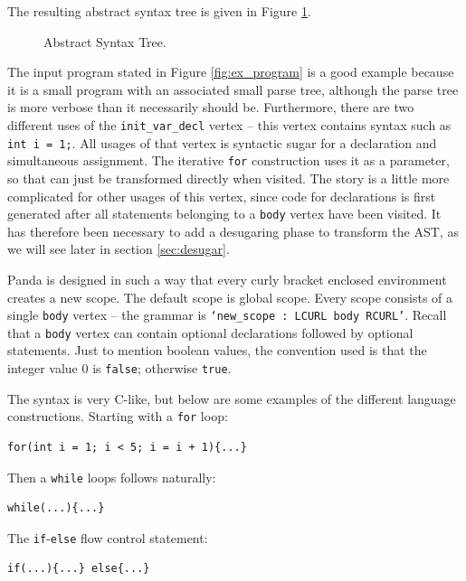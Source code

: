 The resulting abstract syntax tree is given in Figure \ref{fig:AST}.

\begin{figure}[H]
    \centering
    
    \caption{Abstract Syntax Tree.} 
    \label{fig:AST}
\end{figure}

The input program stated in Figure \ref{fig:ex_program} is a good example because it is a small program with an associated small parse tree, although the parse tree is more verbose than it necessarily should be. Furthermore, there are two different uses of the \texttt{init\_var\_decl} vertex -- this vertex contains syntax such as \texttt{int i = 1;}. All usages of that vertex is syntactic sugar for a declaration and simultaneous assignment. The iterative \texttt{for} construction uses it as a parameter, so that can just be transformed directly when visited. The story is a little more complicated for other usages of this vertex, since code for declarations is first generated after all statements belonging to a \texttt{body} vertex have been visited. It has therefore been necessary to add a desugaring phase to transform the AST, as we will see later in section \ref{sec:desugar}.

Panda is designed in such a way that every curly bracket enclosed environment creates a new scope. The default scope is global scope. Every scope consists of a single \texttt{body} vertex -- the grammar is \texttt{`new\_scope : LCURL body RCURL'}. Recall that a \texttt{body} vertex can contain optional declarations followed by optional statements. Just to mention boolean values, the convention used is that the integer value $0$ is \texttt{false}; otherwise \texttt{true}.

The syntax is very C-like, but below are some examples of the different language constructions. Starting with a \texttt{for} loop:

\begin{verbatim}
for(int i = 1; i < 5; i = i + 1){...}
\end{verbatim}

Then a \texttt{while} loops follows naturally:

\begin{verbatim}
while(...){...}
\end{verbatim}

The \texttt{if}-\texttt{else} flow control statement:

\begin{verbatim}
if(...){...} else{...}
\end{verbatim}

